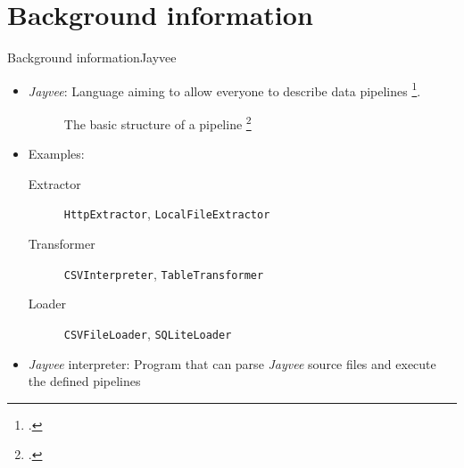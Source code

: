 \section{Background information}
\begin{frame}[t]{Background information}{Jayvee}
	\begin{itemize}
		\item \emph{Jayvee}: Language aiming to allow everyone to describe data pipelines \footcite{jvalue:jayvee}.
		      \begin{figure}[h]
			      \begin{center}
				      
			      \end{center}
			      \caption{The basic structure of a pipeline \footcite{jvalue:jayvee:docs:core_concepts}}
		      \end{figure}
		\item<2-> Examples:
		      \begin{description}
			      \item[Extractor] \Verb|HttpExtractor|, \Verb|LocalFileExtractor|
			      \item[Transformer] \Verb|CSVInterpreter|, \Verb|TableTransformer|
			      \item[Loader] \Verb|CSVFileLoader|, \Verb|SQLiteLoader|
		      \end{description}
		\item<3-> \emph{Jayvee} interpreter: Program that can parse \emph{Jayvee} source files and execute the defined pipelines
	\end{itemize}
\end{frame}


